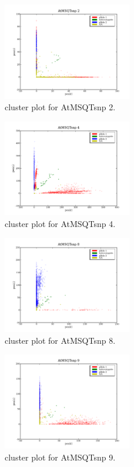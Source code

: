\begin{figure}[H]
\includegraphics[width=0.5\textwidth]{figures/cluster_plot_AtMSQTsnp_2.png}
\caption{cluster plot for AtMSQTsnp 2.} \label{flAtMSQTsnp2}
\end{figure}

\begin{figure}[H]
\includegraphics[width=0.5\textwidth]{figures/cluster_plot_AtMSQTsnp_4.png}
\caption{cluster plot for AtMSQTsnp 4.} \label{flAtMSQTsnp4}
\end{figure}

\begin{figure}[H]
\includegraphics[width=0.5\textwidth]{figures/cluster_plot_AtMSQTsnp_8.png}
\caption{cluster plot for AtMSQTsnp 8.} \label{flAtMSQTsnp8}
\end{figure}

\begin{figure}[H]
\includegraphics[width=0.5\textwidth]{figures/cluster_plot_AtMSQTsnp_9.png}
\caption{cluster plot for AtMSQTsnp 9.} \label{flAtMSQTsnp9}
\end{figure}

